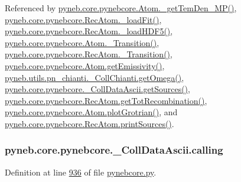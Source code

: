 Referenced by \hyperlink{pynebcore_8py_source_l02046}{pyneb.\-core.\-pynebcore.\-Atom.\-\_\-get\-Tem\-Den\-\_\-\-M\-P()}, \hyperlink{pynebcore_8py_source_l02754}{pyneb.\-core.\-pynebcore.\-Rec\-Atom.\-\_\-load\-Fit()}, \hyperlink{pynebcore_8py_source_l02714}{pyneb.\-core.\-pynebcore.\-Rec\-Atom.\-\_\-load\-H\-D\-F5()}, \hyperlink{pynebcore_8py_source_l01433}{pyneb.\-core.\-pynebcore.\-Atom.\-\_\-\-Transition()}, \hyperlink{pynebcore_8py_source_l02812}{pyneb.\-core.\-pynebcore.\-Rec\-Atom.\-\_\-\-Transition()}, \hyperlink{pynebcore_8py_source_l01782}{pyneb.\-core.\-pynebcore.\-Atom.\-get\-Emissivity()}, \hyperlink{pn__chianti_8py_source_l00507}{pyneb.\-utils.\-pn\-\_\-chianti.\-\_\-\-Coll\-Chianti.\-get\-Omega()}, \hyperlink{pynebcore_8py_source_l01022}{pyneb.\-core.\-pynebcore.\-\_\-\-Coll\-Data\-Ascii.\-get\-Sources()}, \hyperlink{pynebcore_8py_source_l02851}{pyneb.\-core.\-pynebcore.\-Rec\-Atom.\-get\-Tot\-Recombination()}, \hyperlink{pynebcore_8py_source_l02443}{pyneb.\-core.\-pynebcore.\-Atom.\-plot\-Grotrian()}, and \hyperlink{pynebcore_8py_source_l02912}{pyneb.\-core.\-pynebcore.\-Rec\-Atom.\-print\-Sources()}.

\hypertarget{classpyneb_1_1core_1_1pynebcore_1_1___coll_data_ascii_a08efc5898f4e03a1b7702d85f909e188}{
\subsubsection[{calling}]{\setlength{\rightskip}{0pt plus 5cm}pyneb.\-core.\-pynebcore.\-\_\-\-Coll\-Data\-Ascii.\-calling}}\label{classpyneb_1_1core_1_1pynebcore_1_1___coll_data_ascii_a08efc5898f4e03a1b7702d85f909e188}


Definition at line \hyperlink{pynebcore_8py_source_l00936}{936} of file \hyperlink{pynebcore_8py_source}{pynebcore.\-py}.



